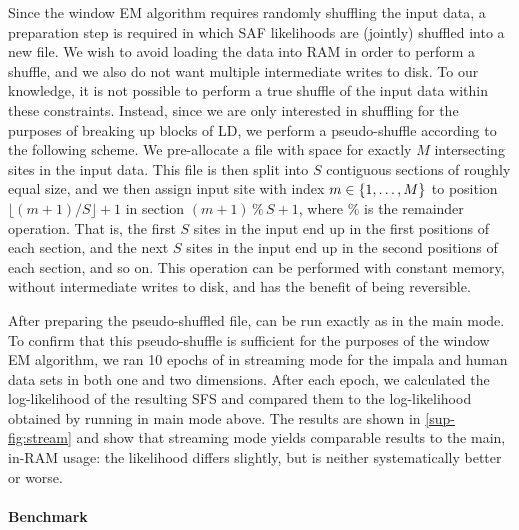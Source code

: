 Since the window EM algorithm requires randomly shuffling the input data, a preparation step is required in which SAF likelihoods are (jointly) shuffled into a new file.
We wish to avoid loading the data into RAM in order to perform a shuffle, and we also do not want multiple intermediate writes to disk.
To our knowledge, it is not possible to perform a true shuffle of the input data within these constraints.
Instead, since we are only interested in shuffling for the purposes of breaking up blocks of LD, we perform a pseudo-shuffle according to the following scheme.
We pre-allocate a file with space for exactly $M$ intersecting sites in the input data.
This file is then split into $S$ contiguous sections of roughly equal size, and we then assign input site with index $m \in \{1, \dots, M\}$ to position $\lfloor (m + 1) / S \rfloor + 1$ in section $(m + 1) \mathbin{\%} S + 1$, where $\mathbin{\%}$ is the remainder operation.
That is, the first $S$ sites in the input end up in the first positions of each section, and the next $S$ sites in the input end up in the second positions of each section, and so on.
This operation can be performed with constant memory, without intermediate writes to disk, and has the benefit of being reversible.

After preparing the pseudo-shuffled file, \winsfs can be run exactly as in the main mode.
To confirm that this pseudo-shuffle is sufficient for the purposes of the window EM algorithm, we ran \num{10} epochs of \winsfs in streaming mode for the impala and human data sets in both one and two dimensions.
After each epoch, we calculated the log-likelihood of the resulting SFS and compared them to the log-likelihood obtained by running in main mode above.
The results are shown in \cref{sup-fig:stream} and show that streaming mode yields comparable results to the main, in-RAM usage:
the likelihood differs slightly, but is neither systematically better or worse.

\paragraph{Benchmark}

